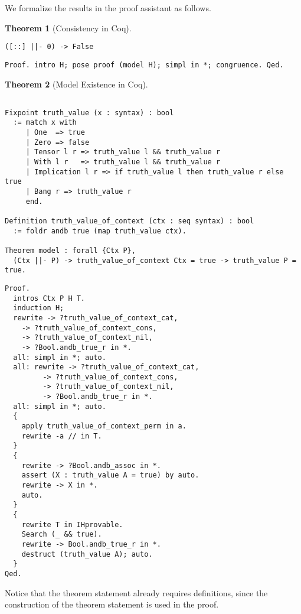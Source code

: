 \documentclass{article}
\newtheorem{thm}{Theorem}
\theoremstyle{definition}
\begin{document}
We formalize the results in the proof assistant as follows. 

\setcounter{savethm}{\value{thm}}
\setcounter{thm}{\value{thmconsistency}}
\begin{thm}[Consistency in Coq]
\begin{verbatim}
([::] ||- 0) -> False
\end{verbatim}
\end{thm}
\noindent
\begin{verbatim}
Proof. intro H; pose proof (model H); simpl in *; congruence. Qed.
\end{verbatim}

\setcounter{thm}{\value{thmexistence}}
\begin{thm}[Model Existence in Coq]
\begin{verbatim}

Fixpoint truth_value (x : syntax) : bool
  := match x with
     | One  => true
     | Zero => false
     | Tensor l r => truth_value l && truth_value r
     | With l r   => truth_value l && truth_value r
     | Implication l r => if truth_value l then truth_value r else true
     | Bang r => truth_value r
     end.

Definition truth_value_of_context (ctx : seq syntax) : bool
  := foldr andb true (map truth_value ctx).
  
Theorem model : forall {Ctx P},
  (Ctx ||- P) -> truth_value_of_context Ctx = true -> truth_value P = true.
\end{verbatim}
\end{thm}
\begin{verbatim}
Proof.
  intros Ctx P H T.
  induction H;
  rewrite -> ?truth_value_of_context_cat,
    -> ?truth_value_of_context_cons,
    -> ?truth_value_of_context_nil,
    -> ?Bool.andb_true_r in *.
  all: simpl in *; auto.  
  all: rewrite -> ?truth_value_of_context_cat,
         -> ?truth_value_of_context_cons,
         -> ?truth_value_of_context_nil,
         -> ?Bool.andb_true_r in *.
  all: simpl in *; auto.  
  {
    apply truth_value_of_context_perm in a.
    rewrite -a // in T.
  }
  {
    rewrite -> ?Bool.andb_assoc in *.    
    assert (X : truth_value A = true) by auto.
    rewrite -> X in *.
    auto.
  }
  {
    rewrite T in IHprovable.
    Search (_ && true).
    rewrite -> Bool.andb_true_r in *.
    destruct (truth_value A); auto.
  }
Qed.
\end{verbatim}

\setcounter{thm}{\value{savethm}}

Notice that the theorem statement already requires definitions, since the construction of the theorem statement is used in the proof. 
\end{document}
